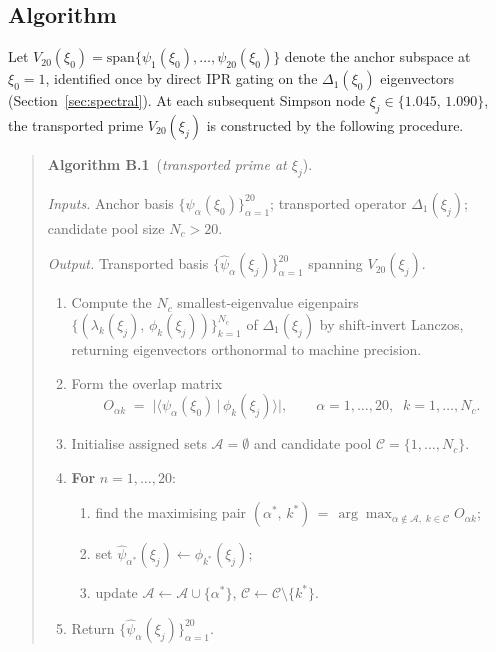 \documentclass[a4paper,11pt]{article}
\theoremstyle{definition}
\begin{document}
\subsection{Algorithm}
\label{app:transport-algorithm}

Let $V_{20}(\xi_0) = \mathrm{span}\{\psi_1(\xi_0),\dots,\psi_{20}(\xi_0)\}$
denote the anchor subspace at $\xi_0 = 1$, identified once by direct IPR
gating on the $\Delta_1(\xi_0)$ eigenvectors
(Section~\ref{sec:spectral}). At each subsequent Simpson node
$\xi_j \in \{1.045,\,1.090\}$, the transported prime $V_{20}(\xi_j)$ is
constructed by the following procedure.

\begin{quote}
\textbf{Algorithm B.1}~(\emph{transported prime at $\xi_j$}).\medskip

\noindent\textit{Inputs.} Anchor basis
$\{\psi_\alpha(\xi_0)\}_{\alpha=1}^{20}$; transported operator
$\Delta_1(\xi_j)$; candidate pool size $N_c > 20$.

\noindent\textit{Output.} Transported basis
$\{\hat\psi_\alpha(\xi_j)\}_{\alpha=1}^{20}$ spanning $V_{20}(\xi_j)$.

\begin{enumerate}
\item Compute the $N_c$ smallest-eigenvalue eigenpairs
$\{(\lambda_k(\xi_j),\,\phi_k(\xi_j))\}_{k=1}^{N_c}$ of $\Delta_1(\xi_j)$
by shift-invert Lanczos, returning eigenvectors orthonormal to machine
precision.

\item Form the overlap matrix
\[
O_{\alpha k}
\;=\;
\bigl|\langle \psi_\alpha(\xi_0) \,|\, \phi_k(\xi_j) \rangle\bigr|,
\qquad
\alpha = 1,\dots,20,\;\; k = 1,\dots,N_c.
\]

\item Initialise assigned sets $\mathcal{A} = \emptyset$ and candidate
pool $\mathcal{C} = \{1,\dots,N_c\}$.

\item \textbf{For} $n = 1,\dots,20$:
\begin{enumerate}
\item[(a)] find the maximising pair
$(\alpha^*,\,k^*) \,=\, \arg\max_{\alpha\notin\mathcal{A},\;k\in\mathcal{C}}
O_{\alpha k}$;
\item[(b)] set $\hat\psi_{\alpha^*}(\xi_j) \leftarrow \phi_{k^*}(\xi_j)$;
\item[(c)] update $\mathcal{A} \leftarrow \mathcal{A} \cup \{\alpha^*\}$,
$\mathcal{C} \leftarrow \mathcal{C}\setminus\{k^*\}$.
\end{enumerate}

\item Return $\{\hat\psi_\alpha(\xi_j)\}_{\alpha=1}^{20}$.
\end{enumerate}
\end{quote}
\end{document}
